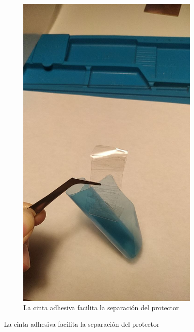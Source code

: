 \pagebreak

\begin{figure}[!htb]
    \centering
    \begin{subfigure}[b]{.475\textwidth}
        \centering
        \includegraphics[width=1\textwidth, trim={0 400 0 500}, clip]{tfg/figuras/06_prototipado/pelicula/separacion_protector_1.png}
        \caption{La cinta adhesiva facilita la separación del protector}
        \label{fig:tfg:06:separacion_1}
    \end{subfigure}

\end{figure}
